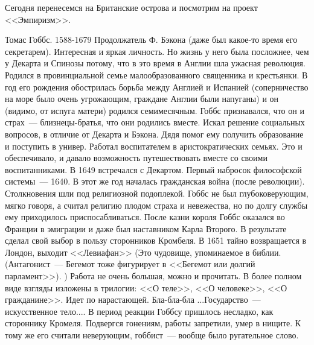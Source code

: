 Сегодня перенесемся на Британские острова и посмотрим на проект <<Эмпиризм>>.

Томас Гоббс. 1588-1679
Продолжатель Ф. Бэкона (даже был какое-то время его секретарем). Интересная и яркая личность. Но жизнь у него была посложнее, чем у Декарта и Спинозы потому, что в это время в Англии шла ужасная революция.
Родился в провинциальной семье малообразованного священника и крестьянки. В год его рождения обострилась борьба между Англией и Испанией (соперничество на море было очень угрожающим, граждане Англии были напуганы) и он (видимо, от испуга матери) родился семимесячным. Гоббс признавался, что он и страх~--- близнецы-братья, что они родились вместе. Искал решение социальных вопросов, в отличие от Декарта и Бэкона. Дядя помог ему получить образование и поступить в универ. Работал воспитателем в аристократических семьях. Это и обеспечивало, и давало возможность путешествовать вместе со своими воспитанниками. В 1649 встречался с Декартом. Первый набросок философской системы~--- 1640. В этот же год началась гражданская война (после революции). Столкновения шли под религиозной подоплекой. Гоббс не был глубоковерующим, мягко говоря, а считал религию плодом страха и невежества, но по долгу службы ему приходилось приспосабливаться. После казни короля Гоббс оказался во Франции в эмиграции и даже был наставником Карла Второго. В результате сделал свой выбор в пользу сторонников Кромбеля. 
В 1651 тайно возвращается в Лондон, выходит <<Левиафан>> (Это чудовище, упоминаемое в библии. (Антагонист~--- Бегемот тоже фигурирует в <<Бегемот или долгий парламент>>). ) Работа не очень большая, можно и прочитать. 
В более полном виде взгляды изложены в трилогии: <<О теле>>, <<О человеке>>, <<О гражданине>>. Идет по нарастающей. Бла-бла-бла ...Государство~--- искусственное тело....
В период реакции Гоббсу пришлось несладко, как стороннику Кромеля. Подвергся гонениям, работы запретили, умер в нищите. К тому же его считали неверующим, гоббист~--- вообще было ругательное слово.

